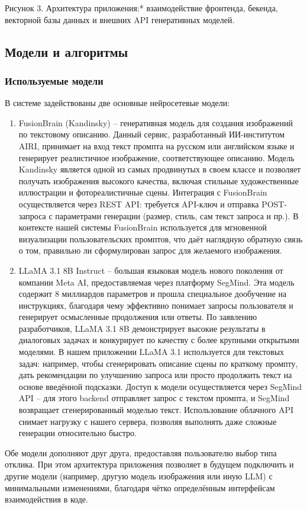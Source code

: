 Рисунок 3. Архитектура приложения:* взаимодействие фронтенда, бекенда, векторной базы данных и внешних API генеративных моделей.

\subsection{ Модели и алгоритмы}
\subsubsection{Используемые модели}

В системе задействованы две основные нейросетевые модели:
\begin{enumerate}[label=\arabic*.]
\item FusionBrain (Kandinsky) – генеративная модель для создания изображений по текстовому описанию. Данный сервис, разработанный ИИ-институтом AIRI, принимает на вход текст промпта на русском или английском языке и генерирует реалистичное изображение, соответствующее описанию. Модель Kandinsky является одной из самых продвинутых в своем классе и позволяет получать изображения высокого качества, включая стильные художественные иллюстрации и фотореалистичные сцены. Интеграция с FusionBrain осуществляется через REST API: требуется API-ключ и отправка POST-запроса с параметрами генерации (размер, стиль, сам текст запроса и пр.). В контексте нашей системы FusionBrain используется для мгновенной визуализации пользовательских промптов, что даёт наглядную обратную связь о том, правильно ли сформулирован запрос для желаемого изображения.
\item LLaMA 3.1 8B Instruct – большая языковая модель нового поколения от компании Meta AI, предоставляемая через платформу SegMind. Эта модель содержит 8 миллиардов параметров и прошла специальное дообучение на инструкциях, благодаря чему эффективно понимает запросы пользователя и генерирует осмысленные продолжения или ответы. По заявлению разработчиков, LLaMA 3.1 8B демонстрирует высокие результаты в диалоговых задачах и конкурирует по качеству с более крупными открытыми моделями. В нашем приложении LLaMA 3.1 используется для текстовых задач: например, чтобы сгенерировать описание сцены по краткому промпту, дать рекомендации по улучшению запроса или просто продолжить текст на основе введённой подсказки. Доступ к модели осуществляется через SegMind API – для этого backend отправляет запрос с текстом промпта, и SegMind возвращает сгенерированный моделью текст. Использование облачного API снимает нагрузку с нашего сервера, позволяя выполнять даже сложные генерации относительно быстро.
\end{enumerate}
Обе модели дополняют друг друга, предоставляя пользователю выбор типа отклика. При этом архитектура приложения позволяет в будущем подключить и другие модели (например, другую модель изображения или иную LLM) с минимальными изменениями, благодаря чётко определённым интерфейсам взаимодействия в коде.

